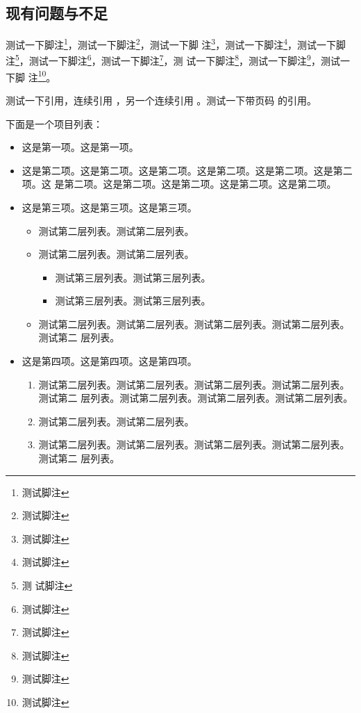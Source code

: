 \documentclass[phd,nobackinfo]{scutthesis}
\begin{document}
\subsection{现有问题与不足}

测试一下脚注\footnote{测试脚注}，测试一下脚注\footnote{测试脚注}，测试一下脚
注\footnote{测试脚注}，测试一下脚注\footnote{测试脚注}，测试一下脚注\footnote{测
  试脚注}，测试一下脚注\footnote{测试脚注}，测试一下脚注\footnote{测试脚注}，测
试一下脚注\footnote{测试脚注}，测试一下脚注\footnote{测试脚注}，测试一下脚
注\footnote{测试脚注}。

测试一下引用\cite{newman2006structure}，连续引用
\cite{newman2001random,aiello2000random,bollobas2001random}，另一个连续引用
\cite{newman2001random,bollobas2001random,barabasi1999emergence}。测试一下带页码
的引用\cite[124--128]{erdHos1961strength}。

下面是一个项目列表：

\begin{itemize}
\item 这是第一项。这是第一项。
\item 这是第二项。这是第二项。这是第二项。这是第二项。这是第二项。这是第二项。这
  是第二项。这是第二项。这是第二项。这是第二项。这是第二项。
\item 这是第三项。这是第三项。这是第三项。
  \begin{itemize}
  \item 测试第二层列表。测试第二层列表。
  \item 测试第二层列表。测试第二层列表。
  \begin{itemize}
     \item 测试第三层列表。测试第三层列表。
     \item 测试第三层列表。测试第三层列表。
  \end{itemize}
  \item 测试第二层列表。测试第二层列表。测试第二层列表。测试第二层列表。测试第二
    层列表。
  \end{itemize}
\item 这是第四项。这是第四项。这是第四项。
  \begin{enumerate}
  \item 测试第二层列表。测试第二层列表。测试第二层列表。测试第二层列表。测试第二
    层列表。测试第二层列表。测试第二层列表。测试第二层列表。
  \item 测试第二层列表。测试第二层列表。
  \item 测试第二层列表。测试第二层列表。测试第二层列表。测试第二层列表。测试第二
    层列表。
  \end{enumerate}
\end{itemize}
\end{document}

